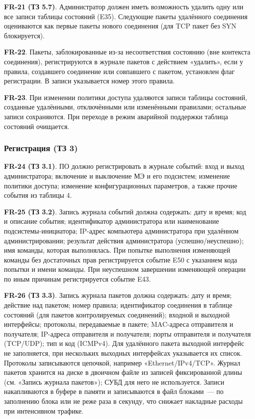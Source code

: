 \documentclass[13pt,a4paper,final]{article}
\begin{document}
	\textbf{FR-21 (ТЗ 5.7)}. Администратор должен иметь возможность удалить одну или все записи таблицы состояний (E35). Следующие пакеты удалённого соединения оцениваются как первые пакеты нового соединения (для TCP пакет без SYN блокируется).
	
	\textbf{FR-22}. Пакеты, заблокированные из-за несоответствия состоянию (вне контекста соединения), регистрируются в журнале пакетов с действием «удалить», если у правила, создавшего соединение или совпавшего с пакетом, установлен флаг регистрации. В записи указывается номер этого правила.
	
	\textbf{FR-23}. При изменении политики доступа удаляются записи таблицы состояний, созданные удалёнными, отключёнными или изменёнными правилами; остальные записи сохраняются. При переходе в режим аварийной поддержки таблица состояний очищается.
	
	\subsubsection{Регистрация (ТЗ 3)}
	
	\textbf{FR-24 (ТЗ 3.1)}. ПО должно регистрировать в журнале событий: вход и выход администратора; включение и выключение МЭ и его подсистем; изменение политики доступа; изменение конфигурационных параметров, а также прочие события из таблицы 4.
	
	\textbf{FR-25 (ТЗ 3.2)}. Запись журнала событий должна содержать: дату и время; код и описание события; идентификатор администратора или наименование подсистемы-инициатора; IP-адрес компьютера администратора при удалённом администрировании; результат действия администратора (успешно/неуспешно); имя команды, которая выполнялась. При попытке выполнения изменяющей команды без достаточных прав регистрируется событие E50 с указанием кода попытки и имени команды. При неуспешном завершении изменяющей операции по иным причинам регистрируется событие E43.
	
	\textbf{FR-26 (ТЗ 3.3)}. Запись журнала пакетов должна содержать: дату и время; действие над пакетом; номер правила; \textcolor{edit}{идентификатор соединения в таблице состояний (для пакетов контролируемых соединений);} входной и выходной интерфейсы; протоколы, передаваемые в пакете; MAC-адреса отправителя и получателя; IP-адреса отправителя и получателя; порты отправителя и получателя (TCP/UDP); тип и код (ICMPv4). Для удалённого пакета выходной интерфейс не заполняется, при нескольких выходных интерфейсах указывается их список. Протоколы записываются цепочкой, например «Ethernet/IPv4/TCP». \textcolor{edit}{Журнал пакетов хранится на диске в двоичном файле из записей фиксированной длины (см. «Запись журнала пакетов»); СУБД для него не используется. Записи накапливаются в буфере в памяти и записываются в файл блоками~--- по заполнению блока или не реже раза в секунду, что снижает накладные расходы при интенсивном трафике.}
	
\end{document}

